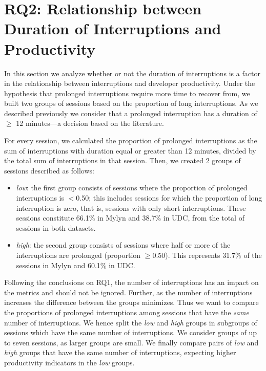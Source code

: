 \documentclass[times]{smrauth}
\begin{document}
\section{RQ2: Relationship between Duration of Interruptions and Productivity}

In this section we analyze whether or not the duration of interruptions is a factor in the relationship between interruptions and developer productivity. Under the hypothesis that prolonged interruptions require more time to recover from, we built two groups of sessions based on the proportion of long interruptions. As we described previously we consider that a prolonged interruption has a duration of $\geq$ 12 minutes---a decision based on the literature\cite{GM04, KaptelininN07}. %

For every session, we calculated the proportion of prolonged interruptions as the sum of interruptions with duration equal or greater than 12 minutes, divided by the total sum of interruptions in that session. Then, we created 2 groups of sessions described as follows:

\begin{itemize}
\item \textit{low}: the first group consists of sessions where the proportion of prolonged interruptions is $<$0.50; this includes sessions for which the proportion of long interruption is zero, that is, sessions with only short interruptions. These sessions constitute 66.1\% in Mylyn and 38.7\% in UDC, from the total of sessions in both datasets.
\item \textit{high}: the second group consists of sessions where half or more of the interruptions are prolonged (proportion $\geq$0.50). This represents 31.7\% of the sessions in Mylyn and 60.1\% in UDC.
\end{itemize} 

Following the conclusions on RQ1, the number of interruptions has an impact on the metrics and should not be ignored. Further, as the number of interruptions increases the difference between the groups minimizes.  %
 Thus we want to compare the proportions of prolonged interruptions among sessions that have the \emph{same} number of interruptions. We hence split the \emph{low} and \emph{high} groups in subgroups of sessions which have the same number of interruptions. We consider groups of up to seven sessions, as larger groups are small. We finally compare pairs of \emph{low} and \emph{high} groups that have the same number of interruptions, expecting higher productivity indicators in the \emph{low} groups.
\end{document}
